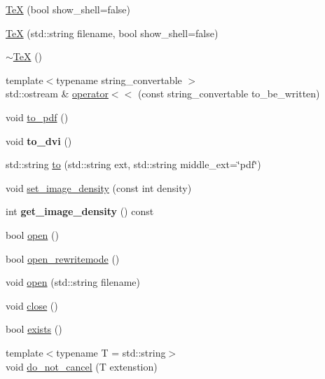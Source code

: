\begin{DoxyCompactItemize}
\item 
\hyperlink{class_te_x_aab21a09cfa857de0126d81b9f5743417}{TeX} (bool show\+\_\+shell=false)
\item 
\hyperlink{class_te_x_a2f70e397b6e5136c7ba421fe82bd5f4d}{TeX} (std\+::string filename, bool show\+\_\+shell=false)
\item 
\hyperlink{class_te_x_ade9e129defdfd30770f256aa178684a3}{$\sim$\+TeX} ()
\item 
{\footnotesize template$<$typename string\+\_\+convertable $>$ }\\std\+::ostream \& \hyperlink{class_te_x_ad82a6fa685379180ba717d341295b89c}{operator$<$$<$} (const string\+\_\+convertable to\+\_\+be\+\_\+written)
\item 
void \hyperlink{class_te_x_a0480cb8479c2c5c3704d573c2b945d92}{to\+\_\+pdf} ()
\item 
\mbox{\label{class_te_x_a3943ff1c49684fddbbecfde268bdd89e}} 
void {\bfseries to\+\_\+dvi} ()
\item 
std\+::string \hyperlink{class_te_x_ad1602a89751db15a14ce7be506ed94b9}{to} (std\+::string ext, std\+::string middle\+\_\+ext=\char`\"{}pdf\char`\"{})
\item 
void \hyperlink{class_te_x_acc84be2a6474f7a354c0dbc5b312637f}{set\+\_\+image\+\_\+density} (const int density)
\item 
\mbox{\label{class_te_x_a9406e9e82feeddbcd9c6cb2e8cef341c}} 
int {\bfseries get\+\_\+image\+\_\+density} () const
\item 
bool \hyperlink{class_te_x_a742040deabcc5e71e314a3e3cf7deaa6}{open} ()
\item 
bool \hyperlink{class_te_x_abcc58201c7ea70c660e22aa633be2c3a}{open\+\_\+rewritemode} ()
\item 
void \hyperlink{class_te_x_ac3807f2a31df4bc40cf679e4f60b87c7}{open} (std\+::string filename)
\item 
void \hyperlink{class_te_x_a6b702106c0b4391ba8bd28aa50298074}{close} ()
\item 
bool \hyperlink{class_te_x_a7dd90c338d4225d8ed2950323d366520}{exists} ()
\item 
{\footnotesize template$<$typename T  = std\+::string$>$ }\\void \hyperlink{class_te_x_a72321520da5083a03a5e80df58236fca}{do\+\_\+not\+\_\+cancel} (T extenstion)
\item 

\end{DoxyCompactItemize}

